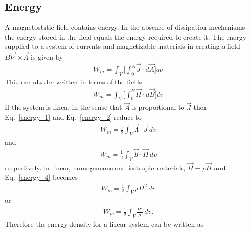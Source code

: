 \documentclass[12pt,a4paper,oneside]{book}
\begin{document}
\begin{onehalfspace}
\subsection{Energy}
A magnetostatic field contains energy. In the absence of dissipation mechanisms the energy stored in the field equals the energy required to create it. The energy supplied to a system of currents and magnetizable materials in creating a field $\vec{B}\vec{\nabla}\times\vec{A}$ is given by
\begin{equation}\label{energy_1}
	\begin{aligned}
		W_m = \int_{V}\Bigg[\int_{0}^{A}\vec{J}\cdot d\vec{A}\Bigg]dv
	\end{aligned}
\end{equation}  
This can also be written in terms of the fields
\begin{equation}\label{energy_2}
	\begin{aligned}
		W_m = \int_{V}\Bigg[\int_{0}^{B}\vec{H}\cdot d\vec{B}\Bigg]dv
	\end{aligned}
\end{equation}  
If the system is linear in the sense that $\vec{A}$ is proportional to $\vec{J}$ then Eq.~\eqref{energy_1} and Eq.~\eqref{energy_2} reduce to 
\begin{equation}\label{energy_3}
\boxed{	\begin{aligned}
		W_m = \frac{1}{2}\int_{V}\vec{A}\cdot \vec{J}\,dv
	\end{aligned}}
\end{equation}  
and
\begin{equation}\label{energy_4}
\boxed{	\begin{aligned}
		W_m = \frac{1}{2}\int_{V}\vec{B}\cdot \vec{H}\,dv
	\end{aligned}}
\end{equation}   
respectively. In linear, homogeneous and isotropic materials, $\vec{B}=\mu\vec{H}$ and Eq.~\eqref{energy_4} becomes
\begin{equation}\label{energy_5}
	\begin{aligned}
		W_m = \frac{1}{2}\int_{V}\mu H^2\,dv
	\end{aligned}
\end{equation} 
or
\begin{equation}\label{energy_6}
	\begin{aligned}
		W_m = \frac{1}{2}\int_{V}\frac{B^2}{\mu}\,dv.
	\end{aligned}
\end{equation} 
Therefore the energy density for a linear system can be written as

\end{onehalfspace}
\end{document}
